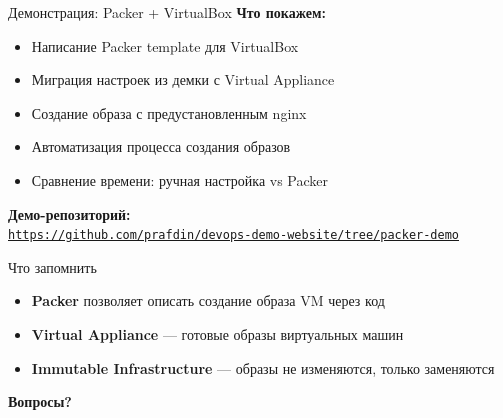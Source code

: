 \documentclass[aspectratio=169]{beamer}
\begin{document}
    \begin{frame}{Демонстрация: Packer + VirtualBox}
        \textbf{Что покажем:}
        \begin{itemize}
            \item Написание Packer template для VirtualBox
            \item Миграция настроек из демки с Virtual Appliance
            \item Создание образа с предустановленным nginx
            \item Автоматизация процесса создания образов
            \item Сравнение времени: ручная настройка vs Packer
        \end{itemize}

        \vspace{0.2cm}
        \textbf{Демо-репозиторий:} \\
        \href{https://github.com/prafdin/devops-demo-website/tree/packer-demo}{\texttt{https://github.com/prafdin/devops-demo-website/tree/packer-demo}}
    \end{frame}

    \begin{frame}{Что запомнить}
        \begin{itemize}
            \item \textbf{Packer} позволяет описать создание образа VM через код
            \item \textbf{Virtual Appliance} — готовые образы виртуальных машин
            \item \textbf{Immutable Infrastructure} — образы не изменяются, только заменяются
        \end{itemize}

        \vspace{1cm}

        \begin{center}
            \textbf{Вопросы?}
        \end{center}
    \end{frame}
\end{document}
